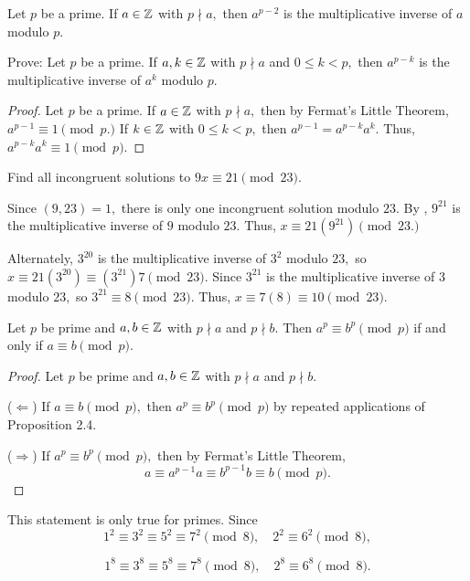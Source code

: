 \documentclass{ximera}
\begin{document}
\begin{corollary}\label{cor:inv-fermat}
  Let $p$ be a prime. If $a\in\mathbb Z$ with $p\nmid a,$ then $a^{p-2}$  is the multiplicative inverse of $a$ modulo $p$.
\end{corollary}

\begin{tps} Prove:
  Let $p$ be a prime. If $a,k\in\mathbb Z$ with $p\nmid a$ and $0\leq k<p,$ then $a^{p-k}$  is the multiplicative inverse of $a^k$ modulo $p$.
  
  
  \begin{proof}
    Let $p$ be a prime. If $a\in\mathbb Z$ with $p\nmid a,$ then by Fermat's Little Theorem, $a^{p-1}\equiv 1\pmod{p.}$ If $k\in\mathbb Z$ with $0\leq k<p,$ then $a^{p-1}=a^{p-k}a^k.$ Thus, $a^{p-k}a^k\equiv 1\pmod{p}.$
  \end{proof}
\end{tps}

\begin{example}
  Find all incongruent solutions to $9x\equiv 21\pmod{23}$.
  
  Since $(9,23)=1,$ there is only one  incongruent solution  modulo $23.$ By , $9^{21}$ is the multiplicative inverse of $9$ modulo ${23}$. Thus, $x\equiv 21(9^{21})\pmod{23.}$

  Alternately, $3^{20}$ is the multiplicative inverse of $3^2$ modulo ${23},$ so $x\equiv 21(3^{20})\equiv  (3^{21})7\pmod{23}.$ Since $3^{21}$ is the multiplicative inverse of $3$ modulo $23,$ so $3^{21}\equiv 8\pmod{23}.$ Thus, $x\equiv 7(8)\equiv 10\pmod{23}.$
\end{example}

\begin{example}
  Let $p$ be prime and $a,b\in\mathbb Z$ with $p\nmid a$ and $p\nmid b.$ Then $a^p\equiv b^p\pmod{p}$ if and only if $a\equiv b\pmod{p}$.
  
  
  \begin{proof}
    Let $p$ be prime and $a,b\in\mathbb Z$ with $p\nmid a$ and $p\nmid b.$ 
      
    ($\Leftarrow$) If $a\equiv  b\pmod{p},$ then $a^p\equiv b^p\pmod{p}$ by repeated applications of Proposition 2.4.
      
    ($\Rightarrow$)  If $a^p\equiv  b^p\pmod{p},$ then by Fermat's Little Theorem, 
      \[a\equiv a^{p-1}a\equiv b^{p-1}b\equiv b\pmod p. \]
  \end{proof}
  \begin{warning}
    This statement is only true for primes. Since
    \[
    1^2\equiv 3^2\equiv 5^2\equiv 7^2\pmod{8},\quad 2^2\equiv 6^2\pmod{8},
    \]
    
    \[
    1^8\equiv 3^8\equiv 5^8\equiv 7^8\pmod{8},\quad  2^8\equiv 6^8\pmod{8}.
    \]
  \end{warning}
\end{example}
\end{document}
